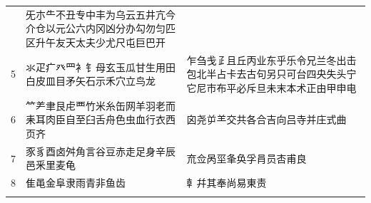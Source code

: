 \begin{longtable}[]{@{}lll@{}}
\begin{minipage}[t]{0.30\columnwidth}
\end{minipage} & \begin{minipage}[t]{0.30\columnwidth}\raggedright
旡朩⺧不丑专中丰为乌云五井亢今介仓以元公六内冈凶分办勾勿匀匹区升午友天太夫少尤尺屯巨巴开\strut
\end{minipage}\tabularnewline
\begin{minipage}[t]{0.30\columnwidth}\raggedright
5\strut
\end{minipage} & \begin{minipage}[t]{0.30\columnwidth}\raggedright
氺疋疒癶罒衤钅母玄玉瓜甘生用田白皮皿目矛矢石示禾穴立鸟龙\strut
\end{minipage} & \begin{minipage}[t]{0.30\columnwidth}\raggedright
乍刍戋𤴔且丘丙业东乎乐令兄兰冬出击包北半占卡去古句另只可台四央失头宁它尼市布平必斥旦未末本术正由甲申电\strut
\end{minipage}\tabularnewline
\begin{minipage}[t]{0.30\columnwidth}\raggedright
6\strut
\end{minipage} & \begin{minipage}[t]{0.30\columnwidth}\raggedright
⺮⺶聿艮虍覀竹米糸缶网羊羽老而耒耳肉臣自至臼舌舟色虫血行衣西页齐\strut
\end{minipage} & \begin{minipage}[t]{0.30\columnwidth}\raggedright
囟尧屰⺷交共各合吉向吕寺并庄式曲\strut
\end{minipage}\tabularnewline
\begin{minipage}[t]{0.30\columnwidth}\raggedright
7\strut
\end{minipage} & \begin{minipage}[t]{0.30\columnwidth}\raggedright
豕豸酉卤舛角言谷豆赤走足身辛辰邑釆里麦龟\strut
\end{minipage} & \begin{minipage}[t]{0.30\columnwidth}\raggedright
㐬佥呙坙夆奂孚肙员㕻甫良\strut
\end{minipage}\tabularnewline
\begin{minipage}[t]{0.30\columnwidth}\raggedright
8\strut
\end{minipage} & \begin{minipage}[t]{0.30\columnwidth}\raggedright
隹黾金阜隶雨青非鱼齿\strut
\end{minipage} & \begin{minipage}[t]{0.30\columnwidth}\raggedright
龺幷其奉尚易東责\strut
\end{minipage}\tabularnewline
\begin{minipage}[t]{0.30\columnwidth}\raggedright

\end{minipage}
\end{longtable}
